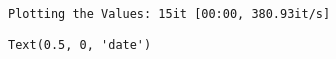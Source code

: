 \documentclass[11pt]{article}
\makeatletter
\newcommand{\boxspacing}{\kern\kvtcb@left@rule\kern\kvtcb@boxsep}
\newcommand{\prompt}[4]{
        {\ttfamily\llap{{\color{#2}[#3]:\hspace{3pt}#4}}\vspace{-\baselineskip}}
    }
\makeatother
\begin{document}
    \begin{Verbatim}[commandchars=\\\{\}]
Plotting the Values: 15it [00:00, 380.93it/s]
    \end{Verbatim}

            \begin{tcolorbox}[breakable, size=fbox, boxrule=.5pt, pad at break*=1mm, opacityfill=0]
\prompt{Out}{outcolor}{61}{\boxspacing}
\begin{Verbatim}[commandchars=\\\{\}]
Text(0.5, 0, 'date')
\end{Verbatim}
\end{tcolorbox}
        
    \begin{center}
    \end{center}
    { \hspace*{\fill} \\}
    
\end{document}
